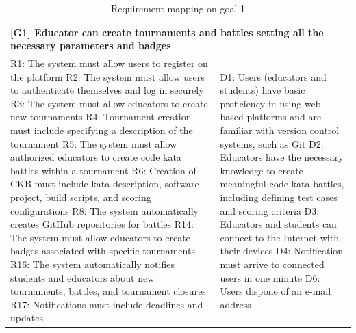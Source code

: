 \begin{table}[h!]
    \centering
    \begin{tabular}{|p{8cm}|p{8cm}|}
    \hline
        \multicolumn{2}{|p{16cm}|}{\textbf{[G1] Educator can create tournaments and battles setting all the necessary parameters and badges}} \\
    \hline
        R1: The system must allow users to register on the platform \newline 
        R2: The system must allow users to authenticate themselves and log in securely \newline
        R3: The system must allow educators to create new tournaments \newline
        R4: Tournament creation must include specifying a description of the tournament \newline
        R5: The system must allow authorized educators to create code kata battles within a tournament \newline
        R6: Creation of CKB must include kata description, software project, build scripts, and scoring configurations \newline
        R8: The system automatically creates GitHub repositories for battles \newline
        R14: The system must allow educators to create badges associated with specific tournaments \newline
        R16: The system automatically notifies students and educators about new tournaments, battles, and tournament closures \newline
        R17: Notifications must include deadlines and updates     
        & 
        D1: Users (educators and students) have basic proficiency in using web-based platforms and are familiar with version control systems, such as Git \newline
        D2: Educators have the necessary knowledge to create meaningful code kata battles, including defining test cases and scoring criteria \newline
        D3: Educators and students can connect to the Internet with their devices \newline
        D4: Notification must arrive to connected users in one minute \newline
        D6: Users dispone of an e-mail address \\
    \hline
    \end{tabular}
    \caption{Requirement mapping on goal 1}
    \label{tab:g1}
\end{table}
